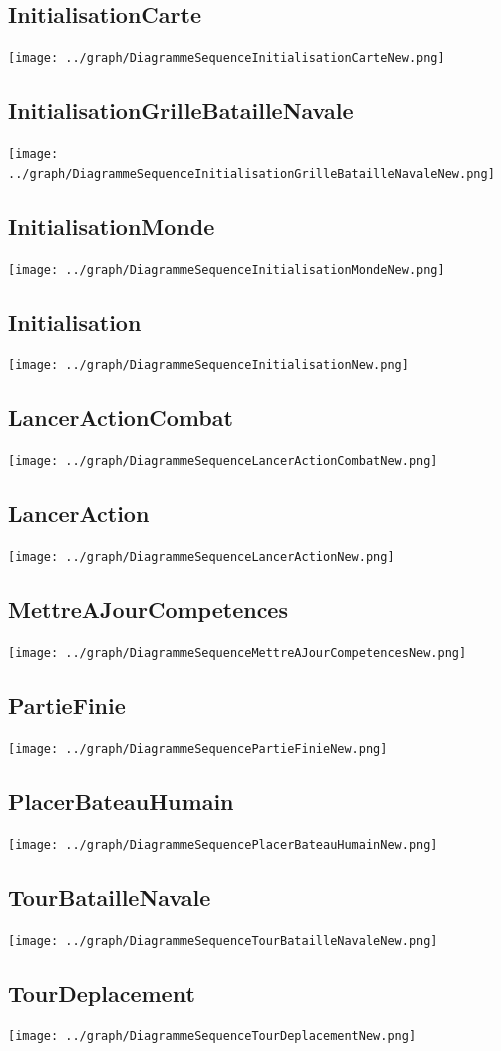        \subsection{InitialisationCarte}
            \texttt{[image: ../graph/DiagrammeSequenceInitialisationCarteNew.png]}
        \subsection{InitialisationGrilleBatailleNavale}
            \texttt{[image: ../graph/DiagrammeSequenceInitialisationGrilleBatailleNavaleNew.png]}
        \subsection{InitialisationMonde}
            \texttt{[image: ../graph/DiagrammeSequenceInitialisationMondeNew.png]}
        \subsection{Initialisation}
            \texttt{[image: ../graph/DiagrammeSequenceInitialisationNew.png]}
        \subsection{LancerActionCombat}
            \texttt{[image: ../graph/DiagrammeSequenceLancerActionCombatNew.png]}
        \subsection{LancerAction}
            \texttt{[image: ../graph/DiagrammeSequenceLancerActionNew.png]}
        \subsection{MettreAJourCompetences}
            \texttt{[image: ../graph/DiagrammeSequenceMettreAJourCompetencesNew.png]}
        \subsection{PartieFinie}
            \texttt{[image: ../graph/DiagrammeSequencePartieFinieNew.png]}
        \subsection{PlacerBateauHumain}
            \texttt{[image: ../graph/DiagrammeSequencePlacerBateauHumainNew.png]}
        \subsection{TourBatailleNavale}
            \texttt{[image: ../graph/DiagrammeSequenceTourBatailleNavaleNew.png]}
        \subsection{TourDeplacement}
            \texttt{[image: ../graph/DiagrammeSequenceTourDeplacementNew.png]}
